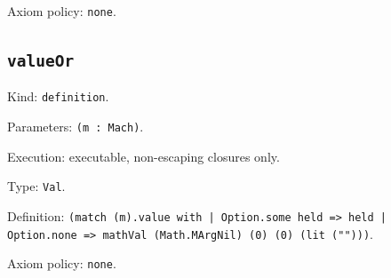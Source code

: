 \documentclass[11pt]{article}
\begin{document}
\noindent Axiom policy: \texttt{none}.\par
\subsection*{\texttt{valueOr}}
\noindent Kind: \texttt{definition}.\par
\noindent Parameters: \texttt{(m : Mach)}.\par
\noindent Execution: executable, non-escaping closures only.\par
\noindent Type: \texttt{Val}.\par
\noindent Definition: \texttt{(match (m).value with | Option.some held => held | Option.none => mathVal (Math.MArgNil) (0) (0) (lit ("")))}.\par
\noindent Axiom policy: \texttt{none}.\par
\end{document}
